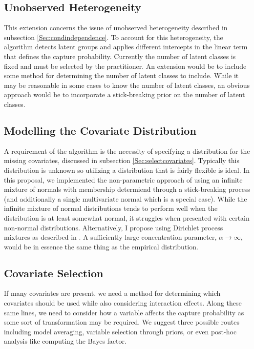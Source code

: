 \documentclass[
  12pt,
]{article}
\begin{document}
\subsection{Unobserved Heterogeneity}

This extension concerns the issue of unobserved heterogeneity described
in subsection \ref{Sec:condindependence}. To account for this
heterogeneity, the algorithm detects latent groups and applies different
intercepts in the linear term that defines the capture probability.
Currently the number of latent classes is fixed and must be selected by
the practitioner. An extension would be to include some method for
determining the number of latent classes to include. While it may be
reasonable in some cases to know the number of latent classes, an
obvious approach would be to incorporate a stick-breaking prior on the
number of latent classes.

\subsection{Modelling the Covariate Distribution}

A requirement of the algorithm is the necessity of specifying a
distribution for the missing covariates, discussed in subsection
\ref{Sec:selectcovariates}. Typically this distribution is unknown so
utilizing a distribution that is fairly flexible is ideal. In this
proposal, we implemented the non-parametric approach of using an
infinite mixture of normals with membership determiend through a
stick-breaking process (and additionally a single multivariate normal
which is a special case). While the infinite mixture of normal
distributions tends to perform well when the distribution is at least
somewhat normal, it struggles when presented with certain non-normal
distributions. Alternatively, I propose using Dirichlet process mixtures
as described in \cite{gelman_bayesian_2014}. A sufficiently large
concentration parameter, \(\alpha \rightarrow \infty\), would be in
essence the same thing as the empirical distribution.

\subsection{Covariate Selection}

If many covariates are present, we need a method for determining which
covariates should be used while also considering interaction effects.
Along these same lines, we need to consider how a variable affects the
capture probability as some sort of transformation may be required. We
suggest three possible routes including model averaging, variable
selection through priors, or even post-hoc analysis like computing the
Bayes factor.
\end{document}
